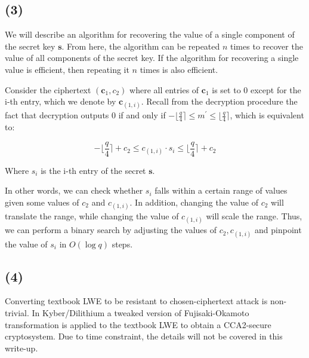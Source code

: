 \documentclass{article}
\newcommand{\round}[1]{\lfloor {#1} \rceil}
\begin{document}
\subsection*{(3)}
We will describe an algorithm for recovering the value of a single component of the secret key $\mathbf{s}$. From here, the algorithm can be repeated $n$ times to recover the value of all components of the secret key. If the algorithm for recovering a single value is efficient, then repeating it $n$ times is also efficient.

Consider the ciphertext $(\mathbf{c}_1, c_2)$ where all entries of $\mathbf{c}_1$ is set to 0 except for the i-th entry, which we denote by $\mathbf{c}_{(1, i)}$. Recall from the decryption procedure the fact that decryption outputs $0$ if and only if $-\round{\frac{q}{4}} \leq m^\prime \leq \round{\frac{q}{4}}$, which is equivalent to:

$$
-\round{\frac{q}{4}} + c_2 \leq c_{(1, i)} \cdot s_i \leq \round{\frac{q}{4}} + c_2
$$

Where $s_i$ is the i-th entry of the secret $\mathbf{s}$.

In other words, we can check whether $s_i$ falls within a certain range of values given some values of $c_2$ and $c_{(1, i)}$. In addition, changing the value of $c_2$ will translate the range, while changing the value of $c_{(1, i)}$ will scale the range. Thus, we can perform a binary search by adjusting the values of $c_2, c_{(1, i)}$ and pinpoint the value of $s_i$ in $O(\log{q})$ steps.

\subsection*{(4)}
Converting textbook LWE to be resistant to chosen-ciphertext attack is non-trivial. In Kyber/Dilithium a tweaked version of Fujisaki-Okamoto transformation is applied to the textbook LWE to obtain a CCA2-secure cryptosystem. Due to time constraint, the details will not be covered in this write-up.
\end{document}
